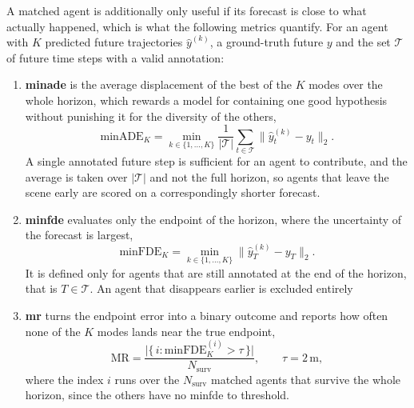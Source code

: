 A matched agent is additionally only useful if its forecast is close to what actually happened, which is
what the following metrics quantify. For an agent with \(K\) predicted future trajectories
\(\hat{y}^{(k)}\), a ground-truth future \(y\) and the set \(\mathcal{T}\) of future time steps with a valid
annotation:

\begin{enumerate}
    \item \textbf{min\acs{ade}} is the average displacement of the best of the \(K\) modes over the whole
    horizon, which rewards a model for containing one good hypothesis without punishing it for the
    diversity of the others,
    \begin{equation}
        \mathrm{minADE}_K = \min_{k \in \{1,\dots,K\}}
        \frac{1}{|\mathcal{T}|} \sum_{t \in \mathcal{T}}
        \big\lVert \hat{y}^{(k)}_t - y_t \big\rVert_2 .
        \label{eq:minade}
    \end{equation}
    A single annotated future step is sufficient for an agent to contribute, and the average is taken over
    \(|\mathcal{T}|\) and not the full horizon, so agents that leave the scene early are scored on
    a correspondingly shorter forecast.

    \item \textbf{min\acs{fde}} evaluates only the endpoint of the horizon, where the uncertainty of the
    forecast is largest,
    \begin{equation}
        \mathrm{minFDE}_K = \min_{k \in \{1,\dots,K\}}
        \big\lVert \hat{y}^{(k)}_{T} - y_{T} \big\rVert_2 .
        \label{eq:minfde}
    \end{equation}
    It is defined only for agents that are still annotated at the end of the horizon, that is
    \(T \in \mathcal{T}\). An agent that disappears earlier is excluded entirely 

    \item \textbf{\Acf{mr}} turns the endpoint error into a binary outcome and reports how often none of the
    \(K\) modes lands near the true endpoint,
    \begin{equation}
        \mathrm{MR} = \frac{\big|\{\, i : \mathrm{minFDE}_K^{(i)} > \tau \,\}\big|}{N_{\mathrm{surv}}},
        \qquad \tau = 2\,\mathrm{m},
        \label{eq:mr}
    \end{equation}
    where the index \(i\) runs over the \(N_{\mathrm{surv}}\) matched agents that survive the whole horizon,
    since the others have no min\acs{fde} to threshold.


\end{enumerate}
